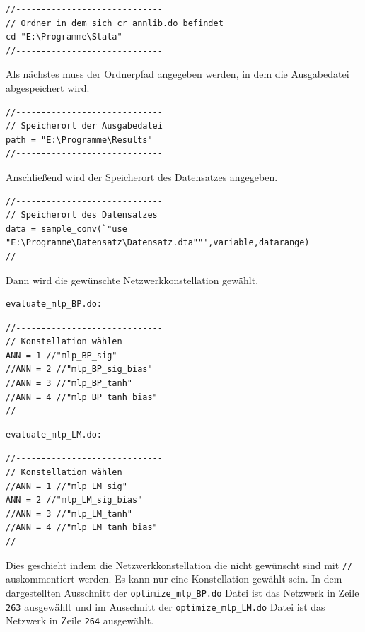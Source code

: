 {
\begin{lstlisting}[firstnumber=4]
//-----------------------------
// Ordner in dem sich cr_annlib.do befindet
cd "E:\Programme\Stata"
//-----------------------------
\end{lstlisting}
}

Als nächstes muss der Ordnerpfad angegeben werden, in dem die Ausgabedatei abgespeichert wird. 

{
\begin{lstlisting}[firstnumber=273]
//-----------------------------
// Speicherort der Ausgabedatei
path = "E:\Programme\Results"
//-----------------------------
\end{lstlisting}
}

Anschließend wird der Speicherort des Datensatzes angegeben.

{
\begin{lstlisting}[firstnumber=305]
//-----------------------------
// Speicherort des Datensatzes
data = sample_conv(`"use "E:\Programme\Datensatz\Datensatz.dta""',variable,datarange)
//-----------------------------
\end{lstlisting}
}

Dann wird die gewünschte Netzwerkkonstellation gewählt.
\begin{Verbatim}
evaluate_mlp_BP.do:
\end{Verbatim}
{
\begin{lstlisting}[firstnumber=262]
//-----------------------------
// Konstellation wählen
ANN = 1 //"mlp_BP_sig"
//ANN = 2 //"mlp_BP_sig_bias"
//ANN = 3 //"mlp_BP_tanh"
//ANN = 4 //"mlp_BP_tanh_bias"
//-----------------------------
\end{lstlisting}
}

\newpage

\begin{Verbatim}
evaluate_mlp_LM.do:
\end{Verbatim}
{
\begin{lstlisting}[firstnumber=262]
//-----------------------------
// Konstellation wählen
//ANN = 1 //"mlp_LM_sig"
ANN = 2 //"mlp_LM_sig_bias"
//ANN = 3 //"mlp_LM_tanh"
//ANN = 4 //"mlp_LM_tanh_bias"
//-----------------------------
\end{lstlisting}
}

Dies geschieht indem die Netzwerkkonstellation die nicht gewünscht sind mit \verb|//| auskommentiert werden. Es kann nur eine Konstellation gewählt sein. In dem dargestellten Ausschnitt der \verb|optimize_mlp_BP.do| Datei ist das Netzwerk in Zeile \verb|263| ausgewählt und im Ausschnitt der \verb|optimize_mlp_LM.do| Datei ist das Netzwerk in Zeile \verb|264| ausgewählt.

